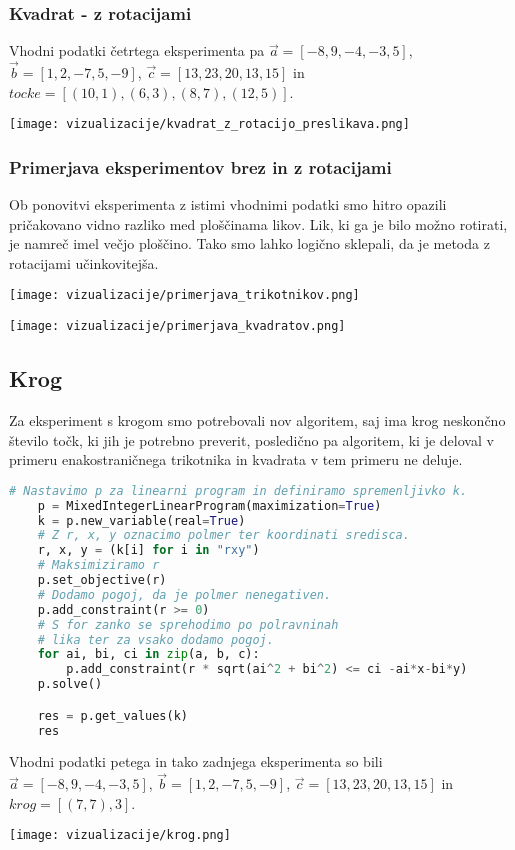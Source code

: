 \documentclass[a4paper, 12pt]{article}
\begin{document}
\subsubsection{Kvadrat - z rotacijami}
Vhodni podatki četrtega eksperimenta pa $\vec{a}=[-8,9,-4,-3,5]$, $\vec{b}=[1,2,-7,5,-9]$, $\vec{c}=[13,23,20,13,15]$ in $tocke = [(10,1),(6,3), (8,7),(12,5)]$.
\begin{center}
    \texttt{[image: vizualizacije/kvadrat\_z\_rotacijo\_preslikava.png]}\\
\end{center}

\subsubsection{Primerjava eksperimentov brez in z rotacijami}
Ob ponovitvi eksperimenta z istimi vhodnimi podatki smo hitro opazili pričakovano vidno razliko med ploščinama likov. Lik, ki ga je bilo možno
rotirati, je namreč imel večjo ploščino.
Tako smo lahko logično sklepali, da je metoda z rotacijami učinkovitejša. 
\begin{center}
    \texttt{[image: vizualizacije/primerjava\_trikotnikov.png]}\\
\end{center}
\begin{center}
    \texttt{[image: vizualizacije/primerjava\_kvadratov.png]}\\
\end{center}


\subsection{Krog}
Za eksperiment s krogom smo potrebovali nov algoritem, saj ima krog neskončno število točk, ki jih je potrebno preverit,
posledično pa algoritem, ki je 
deloval v primeru enakostraničnega trikotnika in kvadrata v tem primeru ne deluje. 
\begin{lstlisting}[language=Python]
    # Nastavimo p za linearni program in definiramo spremenljivko k.
    p = MixedIntegerLinearProgram(maximization=True)
    k = p.new_variable(real=True)
    # Z r, x, y oznacimo polmer ter koordinati sredisca.
    r, x, y = (k[i] for i in "rxy")
    # Maksimiziramo r
    p.set_objective(r)
    # Dodamo pogoj, da je polmer nenegativen.
    p.add_constraint(r >= 0)
    # S for zanko se sprehodimo po polravninah 
    # lika ter za vsako dodamo pogoj.
    for ai, bi, ci in zip(a, b, c):
        p.add_constraint(r * sqrt(ai^2 + bi^2) <= ci -ai*x-bi*y)
    p.solve()

    res = p.get_values(k)
    res
\end{lstlisting}
Vhodni podatki petega in tako zadnjega eksperimenta so bili $\vec{a}=[-8,9,-4,-3,5]$, $\vec{b}=[1,2,-7,5,-9]$, $\vec{c}=[13,23,20,13,15]$ in $krog=[(7,7),3]$.
\begin{center}
    \texttt{[image: vizualizacije/krog.png]}\\
\end{center}
\end{document}
